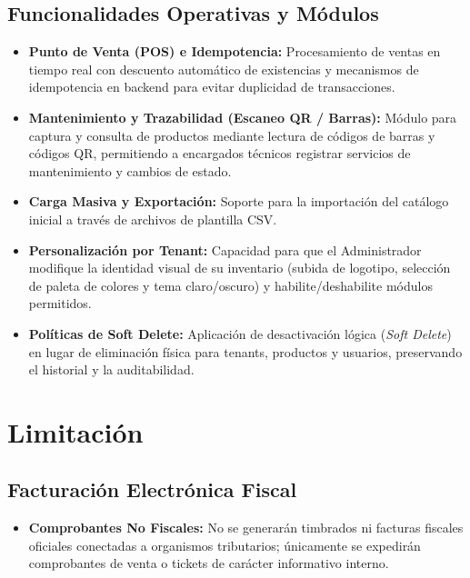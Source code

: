 \subsection{Funcionalidades Operativas y Módulos}

\begin{itemize}
    \item \textbf{Punto de Venta (POS) e Idempotencia:} Procesamiento de ventas en tiempo real con descuento automático de existencias y mecanismos de idempotencia en backend para evitar duplicidad de transacciones.

    \item \textbf{Mantenimiento y Trazabilidad (Escaneo QR / Barras):} Módulo para captura y consulta de productos mediante lectura de códigos de barras y códigos QR, permitiendo a encargados técnicos registrar servicios de mantenimiento y cambios de estado.

    \item \textbf{Carga Masiva y Exportación:} Soporte para la importación del catálogo inicial a través de archivos de plantilla CSV.

    \item \textbf{Personalización por Tenant:} Capacidad para que el Administrador modifique la identidad visual de su inventario (subida de logotipo, selección de paleta de colores y tema claro/oscuro) y habilite/deshabilite módulos permitidos.

    \item \textbf{Políticas de Soft Delete:} Aplicación de desactivación lógica (\textit{Soft Delete}) en lugar de eliminación física para tenants, productos y usuarios, preservando el historial y la auditabilidad.
\end{itemize}


\section{Limitación}

\subsection{Facturación Electrónica Fiscal}

\begin{itemize}
    \item \textbf{Comprobantes No Fiscales:} No se generarán timbrados ni facturas fiscales oficiales conectadas a organismos tributarios; únicamente se expedirán comprobantes de venta o tickets de carácter informativo interno.
\end{itemize}

